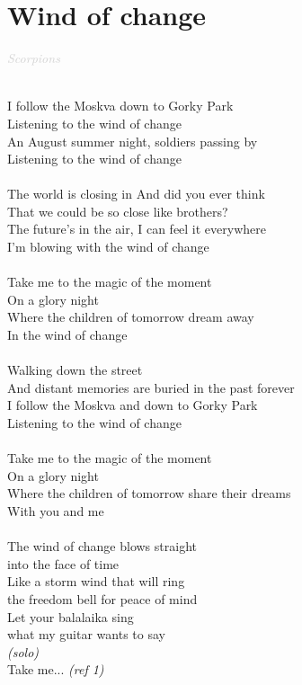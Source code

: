 \documentclass[a5paper, 10pt]{book}
\begin{document}
\newpage
\section{Wind of change}\textcolor{lightgray}{\textit{Scorpions}}\\~\\
\begin{minipage}[t]{0.8\textwidth}
I follow the Moskva down to Gorky Park\\
Listening to the wind of change\\
An August summer night, soldiers passing by\\
Listening to the wind of change\\
\\
The world is closing in And did you ever think\\
That we could be so close like brothers?\\
The future's in the air, I can feel it everywhere\\
I'm blowing with the wind of change\\
\\
\hspace*{3mm}Take me to the magic of the moment\\
\hspace*{3mm}On a glory night\\
\hspace*{3mm}Where the children of tomorrow dream away\\
\hspace*{3mm}In the wind of change\\
\\
Walking down the street\\
And distant memories are buried in the past forever\\
I follow the Moskva and down to Gorky Park\\
Listening to the wind of change\\
\\
\hspace*{3mm}Take me to the magic of the moment\\
\hspace*{3mm}On a glory night\\
\hspace*{3mm}Where the children of tomorrow share their dreams\\
\hspace*{3mm}With you and me\\
\\
The wind of change blows straight\\
into the face of time\\
Like a storm wind that will ring\\ 
the freedom bell for peace of mind\\
Let your balalaika sing\\ 
what my guitar wants to say\\
\hspace*{19mm}\textit{\small (solo)}\\
\hspace*{3mm}Take me... \textit{\small (ref 1)}\\


\end{minipage}
\end{document}
